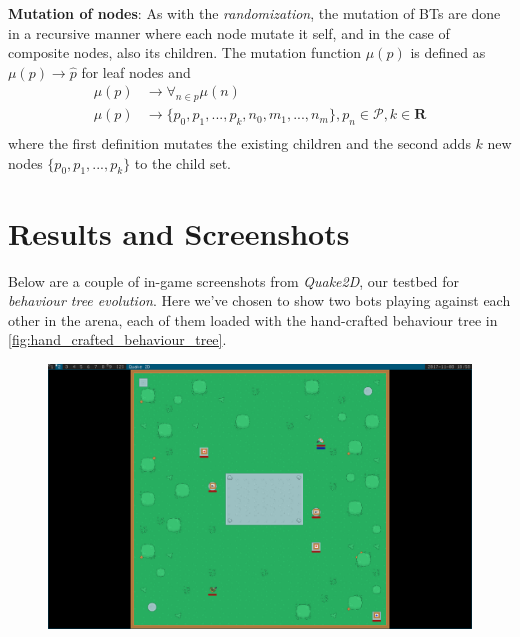 \documentclass[a4paper, twocolumn]{article}
\begin{document}
        \textbf{Mutation of nodes}: As with the \textit{randomization}, the mutation of BTs are done in a recursive manner where each node mutate it self, and in the case of composite nodes, also its children. The mutation function \(\mu(p)\) is defined as \(\mu(p) \rightarrow \hat{p}\) for leaf nodes and 
        \begin{align*}
            \mu(p) &\rightarrow \forall_{n \in p}{\mu(n)} \\
            \mu(p) &\rightarrow \{p_0,p_1,...,p_k,n_0,m_1,...,n_m\}, p_n \in \mathcal{P}, k \in \mathbf{R} \\
        \end{align*}
        where the first definition mutates the existing children and the second adds \(k\) new nodes \(\{p_0,p_1,...,p_k\}\) to the child set.

    \clearpage

    \section{Results and Screenshots} \label{sec:results_and_screenshots}

        Below are a couple of in-game screenshots from \emph{Quake2D}, our testbed for \emph{behaviour tree evolution}. Here we've chosen to show two bots playing against each other in the arena, each of them loaded with the hand-crafted behaviour tree in \cref{fig:hand_crafted_behaviour_tree}.

        \begin{figure}[H]
            \centering
            \includegraphics[width=\linewidth]{share/screenshot.png}
            \label{fig:behaviour_tree_screenshot}
        \end{figure}
\end{document}
